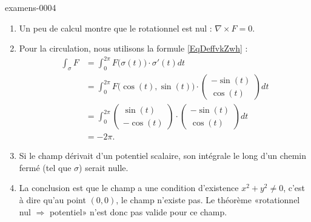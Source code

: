 
\begin{corrige}{examens-0004}

    \begin{enumerate}
        \item
            Un peu de calcul montre que le rotationnel est nul : \( \nabla \times F=0\).
        \item
            Pour la circulation, nous utilisons la formule \eqref{EqDeffvkZwh} :
            \begin{subequations}
                \begin{align}
                    \int_{\sigma}F&=\int_0^{2\pi} F\big( \sigma(t) \big)\cdot \sigma'(t)dt\\
                    &=\int_0^{2\pi}F\big( \cos(t),\sin(t) \big)\cdot\begin{pmatrix}
                        -\sin(t)    \\ 
                        \cos(t)    
                    \end{pmatrix}dt\\
                    &=\int_0^{2\pi}\begin{pmatrix}
                        \sin(t)    \\ 
                        -\cos(t)    
                    \end{pmatrix}\cdot
                    \begin{pmatrix}
                        -\sin(t)    \\ 
                        \cos(t)    
                    \end{pmatrix}dt\\
                    &=-2\pi.
                \end{align}
            \end{subequations}
        \item
            Si le champ dérivait d'un potentiel scalaire, son intégrale le long d'un chemin fermé (tel que \( \sigma\)) serait nulle.
        \item
            La conclusion est que le champ a une condition d'existence \( x^2+y^2\neq 0\), c'est à dire qu'au point \( (0,0)\), le champ n'existe pas. Le théorème «rotationnel nul \( \Rightarrow\) potentiel» n'est donc pas valide pour ce champ.

    \end{enumerate}

\end{corrige}
